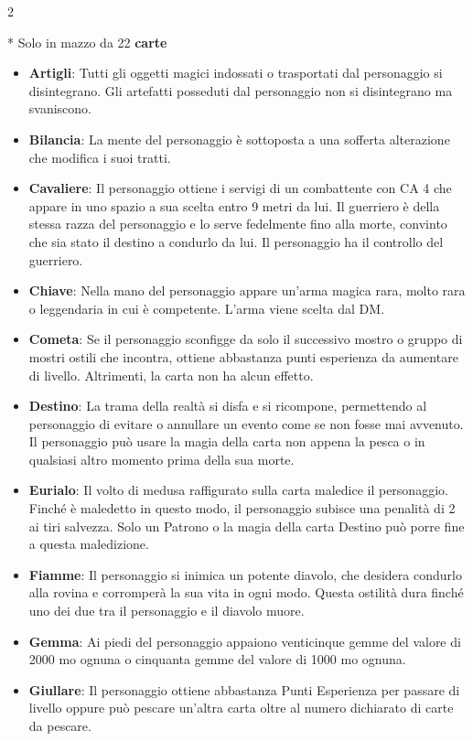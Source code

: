 \begin{multicols}{2}
\medskip

* Solo in mazzo da 22 \textbf{carte}

\noindent\begin{itemize}[leftmargin=*] \setlength{\itemsep}{0pt}
\item \textbf{Artigli}: Tutti gli oggetti magici indossati o trasportati dal personaggio si disintegrano. Gli artefatti posseduti dal personaggio non si disintegrano ma svaniscono.
\item \textbf{Bilancia}: La mente del personaggio è sottoposta a una sofferta alterazione che modifica i suoi tratti.
\item \textbf{Cavaliere}: Il personaggio ottiene i servigi di un combattente con CA 4 che appare in uno spazio a sua scelta entro 9 metri da lui. Il guerriero è della stessa razza del personaggio e lo serve fedelmente fino alla morte, convinto che sia stato il destino a condurlo da lui. Il personaggio ha il controllo del guerriero.
\item \textbf{Chiave}: Nella mano del personaggio appare un’arma magica rara, molto rara o leggendaria in cui è competente. L’arma viene scelta dal DM.
\item \textbf{Cometa}: Se il personaggio sconfigge da solo il successivo mostro o gruppo di mostri ostili che incontra, ottiene abbastanza punti esperienza da aumentare di livello. Altrimenti, la carta non ha alcun effetto.
\item \textbf{Destino}: La trama della realtà si disfa e si ricompone, permettendo al personaggio di evitare o annullare un evento come se non fosse mai avvenuto. Il personaggio può usare la magia della carta non appena la pesca o in qualsiasi altro momento prima della sua morte.
\item \textbf{Eurialo}: Il volto di medusa raffigurato sulla carta maledice il personaggio. Finché è maledetto in questo modo, il personaggio subisce una penalità di 2 ai tiri salvezza. Solo un Patrono o la magia della carta Destino può porre fine a questa maledizione.
\item \textbf{Fiamme}: Il personaggio si inimica un potente diavolo, che desidera condurlo alla rovina e corromperà la sua vita in ogni modo. Questa ostilità dura finché uno dei due tra il personaggio e il diavolo muore.
\item \textbf{Gemma}: Ai piedi del personaggio appaiono venticinque gemme del valore di 2000 mo ognuna o cinquanta gemme del valore di 1000 mo ognuna.
\item \textbf{Giullare}: Il personaggio ottiene abbastanza Punti Esperienza per passare di livello oppure può pescare un'altra carta oltre al numero dichiarato di carte da pescare.

\end{itemize}
\end{multicols}
